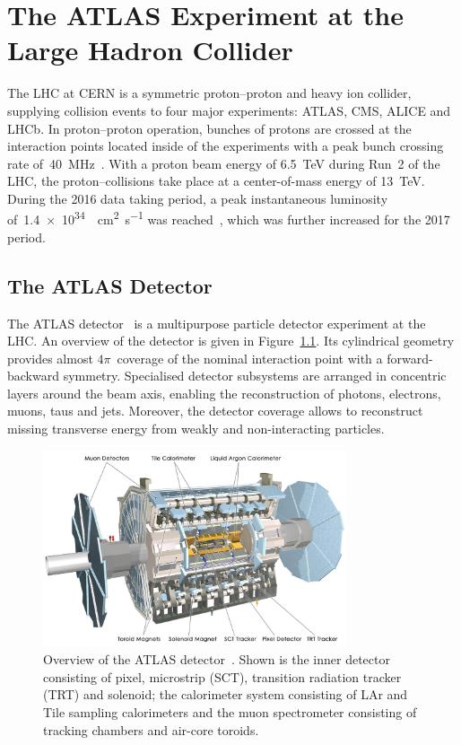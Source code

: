 \chapter{The ATLAS Experiment at the Large Hadron Collider}
\label{chap:atlas}

The LHC at CERN is a symmetric proton--proton and heavy ion collider, supplying
collision events to four major experiments: ATLAS, CMS, ALICE and LHCb. In
proton--proton operation, bunches of protons are crossed at the interaction
points located inside of the experiments with a peak bunch crossing rate
of~\SI{40}{\mega\hertz}~\cite{lhc}. With a proton beam energy of \SI{6.5}{\TeV}
during Run~2 of the LHC, the proton--collisions take place at a center-of-mass
energy of \SI{13}{\TeV}. During the 2016 data taking period, a peak
instantaneous luminosity of~\SI{1.4e34}{\per\square\centi\metre\per\second} was
reached~\cite{lhc_2016_report}, which was further increased for the 2017 period.

\section{The ATLAS Detector}
\label{sec:atlas}

The ATLAS detector~\cite{atlas_detector} is a multipurpose particle detector
experiment at the LHC. An overview of the detector is given in
Figure~\ref{fig:atlas_detector}. Its cylindrical geometry provides almost
$4\pi$~coverage of the nominal interaction point with a forward-backward
symmetry. Specialised detector subsystems are arranged in concentric layers
around the beam axis, enabling the reconstruction of photons, electrons, muons,
taus and jets. Moreover, the detector coverage allows to reconstruct missing
transverse energy from weakly and non-interacting particles.

\begin{figure}[htb]
  \centering
  \includegraphics[width=0.8\textwidth]{./figures/atlas/overview.jpg}
  \caption{Overview of the ATLAS detector~\cite{atlas_detector}. Shown is the
    inner detector consisting of pixel, microstrip (SCT), transition radiation
    tracker (TRT) and solenoid; the calorimeter system consisting of LAr and
    Tile sampling calorimeters and the muon spectrometer consisting of tracking
    chambers and air-core toroids.}
  \label{fig:atlas_detector}
\end{figure}

